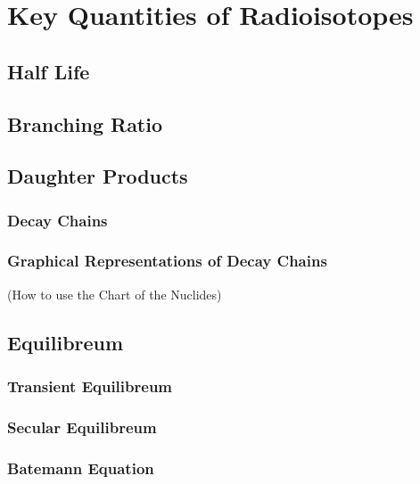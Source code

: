 \chapter{Key Quantities of Radioisotopes}

\section{Half Life}

\section{Branching Ratio}

\section{Daughter Products}
\subsection{Decay Chains}
\subsection{Graphical Representations of Decay Chains}
(How to use the Chart of the Nuclides)

\section{Equilibreum}
\subsection{Transient Equilibreum}
\subsection{Secular Equilibreum}
\subsection{Batemann Equation}


